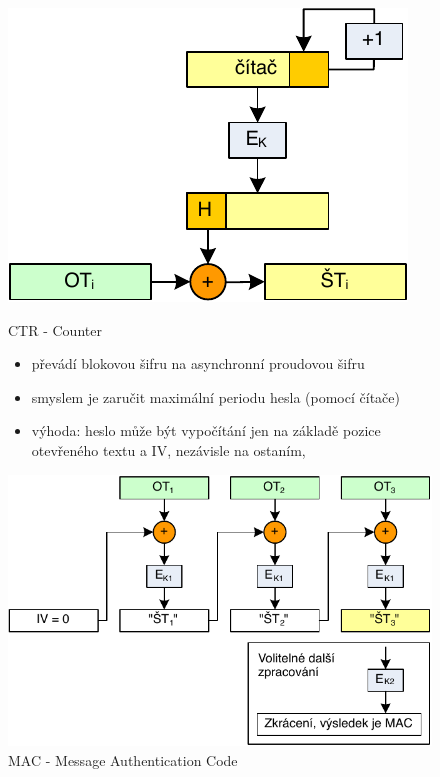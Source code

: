 \documentclass{szzclass}
\begin{document}
\begin{figure}[ht!]
\centering
\begin{minipage}{.5\textwidth}
  \centering
  \includegraphics[width=.5\linewidth]{topics/bi-spol-07/images/ctr}
  \caption{CTR - Counter}
  \begin{itemize}
    \item převádí blokovou šifru na asynchronní proudovou šifru
    \item smyslem je zaručit maximální periodu hesla (pomocí čítače)
    \item výhoda: heslo může být vypočítání jen na základě pozice otevřeného textu a IV, nezávisle na ostaním,
  \end{itemize}
\end{minipage}%
\begin{minipage}{.5\textwidth}
  \centering
  \includegraphics[width=.75\linewidth]{topics/bi-spol-07/images/mac}
  \caption{MAC - Message Authentication Code}
\end{minipage}
\end{figure}


\end{document}

